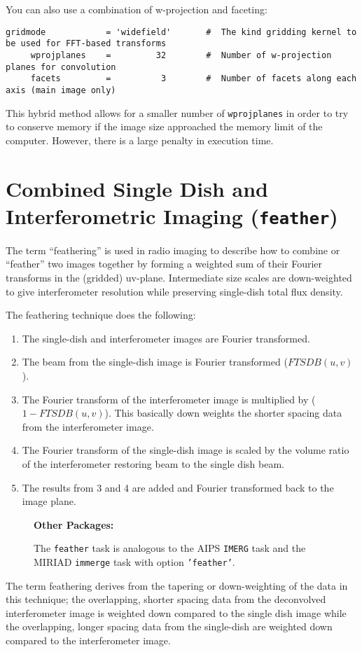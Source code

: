 You can also use a combination of w-projection and faceting:
\small
\begin{verbatim}
gridmode            = 'widefield'       #  The kind gridding kernel to be used for FFT-based transforms
     wprojplanes    =         32        #  Number of w-projection planes for convolution
     facets         =          3        #  Number of facets along each axis (main image only)
\end{verbatim}
\normalsize
This hybrid method allows for a smaller number of {\tt wprojplanes} in order
to try to conserve memory if the image size approached the memory limit
of the computer.  However, there is a large penalty in execution time.

\section{Combined Single Dish and Interferometric Imaging 
         ({\tt feather})}
\label{section:im.feather}

The term ``feathering'' is used in radio imaging to describe how to
combine or ``feather'' two images together by forming a weighted
sum of their Fourier transforms in the (gridded) uv-plane.
Intermediate size scales are down-weighted to give interferometer
resolution while preserving single-dish total flux density.

The feathering technique does the following:
\begin{enumerate}
\item The single-dish and interferometer images are Fourier
      transformed.
\item The beam from the single-dish image is Fourier transformed
      ($FTSDB(u,v)$).
\item The Fourier transform of the interferometer image is multiplied
      by ($1-FTSDB(u,v)$).  This basically down weights the shorter
      spacing data from the interferometer image.
\item The Fourier transform of the single-dish image is scaled by the
      volume ratio of the interferometer restoring beam to the single
      dish beam.
\item The results from 3 and 4 are added and Fourier transformed
      back to the image plane.
\end{enumerate}

\begin{wrapfigure}{r}{2.5in}
  \begin{boxedminipage}{2.5in}
     \centerline{\bf Other Packages:}
     The {\tt feather} task is analogous to the AIPS {\tt IMERG} 
     task and the MIRIAD {\tt immerge} task with option 
     {\tt 'feather'}.
  \end{boxedminipage}
\end{wrapfigure}
The term feathering derives from the tapering or down-weighting of the
data in this technique; the overlapping, shorter spacing data from the
deconvolved interferometer image is weighted down compared to the
single dish image while the overlapping, longer spacing data from the
single-dish are weighted down compared to the interferometer image.

